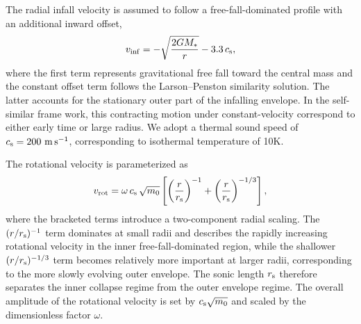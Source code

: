 The radial infall velocity is assumed to follow a free-fall-dominated profile with an additional inward offset,
\begin{align}\label{eq:v_infall}
    v_{\rm inf} = -\sqrt{\frac{2GM_*}{r}} - 3.3\,c_{\rm s},
\end{align}
where the first term represents gravitational free fall toward the central mass and the constant offset term follows the Larson--Penston similarity solution. The latter accounts for the stationary outer part of the infalling envelope. In the self-similar frame work, this contracting motion under constant-velocity correspond to either early time or large radius. We adopt a thermal sound speed of $c_{\rm s} = 200~\mathrm{m\,s^{-1}}$, corresponding to isothermal temperature of 10K.

The rotational velocity is parameterized as
\begin{align}\label{eq:v_rot}
    v_{\rm rot} = \omega\,c_{\rm s}\,\sqrt{m_0}
    \left[
    \left(\frac{r}{r_{\rm s}}\right)^{-1}
    + \left(\frac{r}{r_{\rm s}}\right)^{-1/3}
    \right],
\end{align}
where the bracketed terms introduce a two-component radial scaling. The $(r/r_{\rm s})^{-1}$ term dominates at small radii and describes the rapidly increasing rotational velocity in the inner free-fall-dominated region, while the shallower $(r/r_{\rm s})^{-1/3}$ term becomes relatively more important at larger radii, corresponding to the more slowly evolving outer envelope. The sonic length $r_{\rm s}$ therefore separates the inner collapse regime from the outer envelope regime. The overall amplitude of the rotational velocity is set by $c_{\rm s}\sqrt{m_0}$ and scaled by the dimensionless factor $\omega$.



